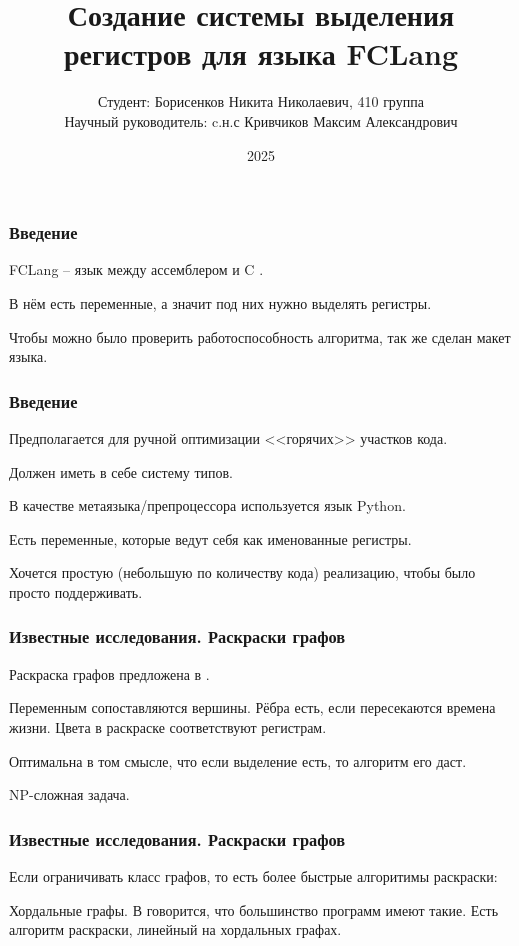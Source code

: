 \documentclass[10pt,a4paper]{beamer}
\title{Создание системы выделения регистров для языка FCLang}
\author{Студент: Борисенков Никита Николаевич, 410 группа\\
Научный руководитель: c.н.с Кривчиков Максим Александрович}
\date{2025}
\begin{document}
\maketitle

\begin{frame}
    \frametitle{Введение}

    FCLang -- язык между ассемблером и C \cite{____2023}.

    В нём есть переменные, а значит под них нужно выделять регистры.

    Чтобы можно было проверить работоспособность алгоритма, так же сделан макет языка.

\end{frame}

\begin{frame}
    \frametitle{Введение}

    Предполагается для ручной оптимизации <<горячих>> участков кода.

    Должен иметь в себе систему типов.

    В качестве метаязыка/препроцессора используется язык Python.

    Есть переменные, которые ведут себя как именованные регистры.

    Хочется простую (небольшую по количеству кода) реализацию, чтобы было просто поддерживать.

\end{frame}

\begin{frame}
    \frametitle{Известные исследования. Раскраски графов}
    Раскраска графов предложена в \cite{chaitin_register_1981}.

    Переменным сопоставляются вершины. Рёбра есть, если пересекаются времена жизни.
    Цвета в раскраске соответствуют регистрам.

    Оптимальна в том смысле, что если выделение есть, то алгоритм его даст.

    NP-сложная задача.

\end{frame}

\begin{frame}
    \frametitle{Известные исследования. Раскраски графов}
    Если ограничивать класс графов, то есть более быстрые алгоритимы раскраски:

    Хордальные графы.
    В \cite{hutchison_register_2005} говорится, что большинство программ имеют такие.
    Есть алгоритм раскраски, линейный на хордальных графах.
\end{frame}
\end{document}
